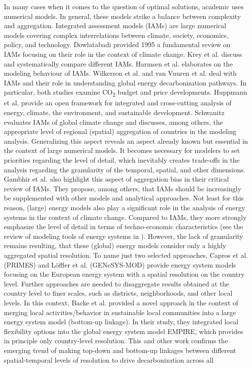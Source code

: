 In many cases when it comes to the question of optimal solutions, academic uses numerical models. In general, these models strike a balance between complexity and aggregation. Integrated assessment models (IAMs) are large numerical models covering complex interrelations between climate, society, economics, policy, and technology. Dowlatabadi \cite{dowlatabadi1995integrated} provided 1995 a fundamental review on IAMs focusing on their role in the context of climate change. Krey et al. \cite{krey2019looking} discuss and systematically compare different IAMs. Harmsen et al. \cite{harmsen2021integrated} elaborates on the modeling behaviour of IAMs. Wilkerson et al. \cite{wilkerson2015comparison} and van Vuuren et al. \cite{van2016carbon} deal with IAMs and their role in understanding global energy decarbonization pathways. In particular, both studies examine CO\textsubscript{2} budget and price developments. Huppmann et al. \cite{huppmann2019messageix} provide an open framework for integrated and cross-cutting analysis of energy, climate, the environment, and sustainable development. Schwanitz \cite{schwanitz2013evaluating} evaluates IAMs of global climate change and discusses, among others, the appropriate level of regional (spatial) aggregation of countries in the modeling analysis. Generalizing this aspect reveals an aspect already known but essential in the context of large numerical models. It becomes necessary for modelers to set priorities regarding the level of detail, which inevitably creates trade-offs in the analysis regarding the granularity of the temporal, spatial, and other dimensions. Gambhir et al. \cite{gambhir2019review} also highlight this aspect of aggregation bias in their critical review of IAMs. They propose, among others, that IAMs should be increasingly be supplemented with other models and analytical approaches. Not least for this reason, (large) energy models also play a significant role in the analysis of energy systems in the context of climate change. Compared to IAMs, they more strongly emphasize the level of detail in terms of techno-economic characteristics (see the review of modeling tools of energy systems in \cite{ringkjob2018review}). However, the lack of granularity remains resulting, that these (global) energy models consider only a highly aggregated spatial resolution. To name just two selected approaches, Capros et al. \cite{capros2012model} (PRIMES) and Löffler et al. \cite{loffler2017designing} (GENeSYS-MOD) provide energy system models focusing on the European energy system with a spatial resolution on the country level. Further approaches are needed to disaggregate results obtained at the country level to finer scales, such as districts, neighborhoods, and other local levels. In this context, Backe et al. \cite{backe2021heat} provided a novel approach in the context of merging local activities/behavior in sustainable local communities into a large energy system model (bottom-up linkage). In their study, they integrated local flexibility options into the global energy system model EMPIRE, which provides in principle only country-level resolution. This and other work confirms the emerging trend of making top-down and bottom-up linkages between different spatial-temporal levels of resolution to drive decarbonization across all 